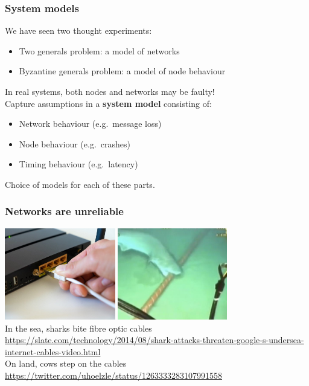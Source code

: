 \begin{frame}
    \label{s:system-model}
    \frametitle{System models}
    We have seen two thought experiments:
    \begin{itemize}
        \item Two generals problem: a model of networks
        \item Byzantine generals problem: a model of node behaviour
    \end{itemize}
    In real systems, both nodes and networks may be faulty!\\[2em]\pause
    Capture assumptions in a \textbf{system model} consisting of:
    \begin{itemize}
        \item Network behaviour (e.g.\ message loss)
        \item Node behaviour (e.g.\ crashes)
        \item Timing behaviour (e.g.\ latency)
    \end{itemize}
    Choice of models for each of these parts.
\end{frame}
\label{l:system-model}

\begin{frame}
    \label{s:shark-bite}
    \frametitle{Networks are unreliable}
    \includegraphics[height=4cm]{images/network-cable.jpg}
    \includegraphics[height=4cm]{images/shark-bite.jpg}\\[1em]
    In the sea, sharks bite fibre optic cables \\
    {\scriptsize\url{https://slate.com/technology/2014/08/shark-attacks-threaten-google-s-undersea-internet-cables-video.html}}\\[1em]
    On land, cows step on the cables \\
    {\scriptsize\url{https://twitter.com/uhoelzle/status/1263333283107991558}}
\end{frame}
\label{l:shark-bite}

